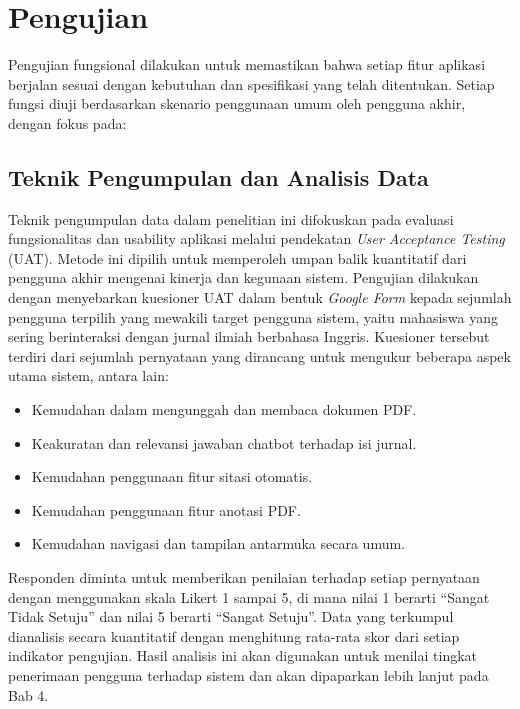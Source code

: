 \section{Pengujian}
Pengujian fungsional dilakukan untuk memastikan bahwa setiap fitur aplikasi berjalan sesuai dengan kebutuhan dan spesifikasi yang telah ditentukan. Setiap fungsi diuji berdasarkan skenario penggunaan umum oleh pengguna akhir, dengan fokus pada:

\subsection{Teknik Pengumpulan dan Analisis Data}

Teknik pengumpulan data dalam penelitian ini difokuskan pada evaluasi fungsionalitas dan usability aplikasi melalui pendekatan \textit{User Acceptance Testing} (UAT). Metode ini dipilih untuk memperoleh umpan balik kuantitatif dari pengguna akhir mengenai kinerja dan kegunaan sistem.
\singlespacing{}
Pengujian dilakukan dengan menyebarkan kuesioner UAT dalam bentuk \textit{Google Form} kepada sejumlah pengguna terpilih yang mewakili target pengguna sistem, yaitu mahasiswa yang sering berinteraksi dengan jurnal ilmiah berbahasa Inggris. Kuesioner tersebut terdiri dari sejumlah pernyataan yang dirancang untuk mengukur beberapa aspek utama sistem, antara lain:

\begin{itemize}
  \item Kemudahan dalam mengunggah dan membaca dokumen PDF.\@
  \item Keakuratan dan relevansi jawaban chatbot terhadap isi jurnal.
  \item Kemudahan penggunaan fitur sitasi otomatis.
  \item Kemudahan penggunaan fitur anotasi PDF.\@
  \item Kemudahan navigasi dan tampilan antarmuka secara umum.
\end{itemize}

Responden diminta untuk memberikan penilaian terhadap setiap pernyataan dengan menggunakan skala Likert 1 sampai 5, di mana nilai 1 berarti ``Sangat Tidak Setuju'' dan nilai 5 berarti ``Sangat Setuju''. Data yang terkumpul dianalisis secara kuantitatif dengan menghitung rata-rata skor dari setiap indikator pengujian. Hasil analisis ini akan digunakan untuk menilai tingkat penerimaan pengguna terhadap sistem dan akan dipaparkan lebih lanjut pada Bab 4.